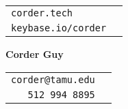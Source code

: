 \documentclass[12pt]{article}
\begin{document}
\noindent
\begin{minipage}{0.3\linewidth}
    \begin{flushleft}
        \begin{tabular}{l l}
            \verb|corder.tech| \\
            \verb|keybase.io/corder|
        \end{tabular}
    \end{flushleft}
\end{minipage}
\hfill
\begin{minipage}{0.3\linewidth}
    \begin{center}
        {\Huge\textbf{Corder Guy}}
    \end{center}
\end{minipage}
\hfill
\begin{minipage}{0.3\linewidth}
    \begin{flushright}
        \begin{tabular}{r l}
            \verb|corder@tamu.edu| \\
            \verb|512 994 8895|
        \end{tabular}
    \end{flushright}
\end{minipage}

\end{document}
